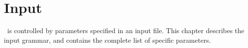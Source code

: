 
\chapter{Input} \label{c:input}

\cello\ is controlled by parameters specified in an input file.
This chapter describes the input grammar, and contains the complete
list of specific parameters.







